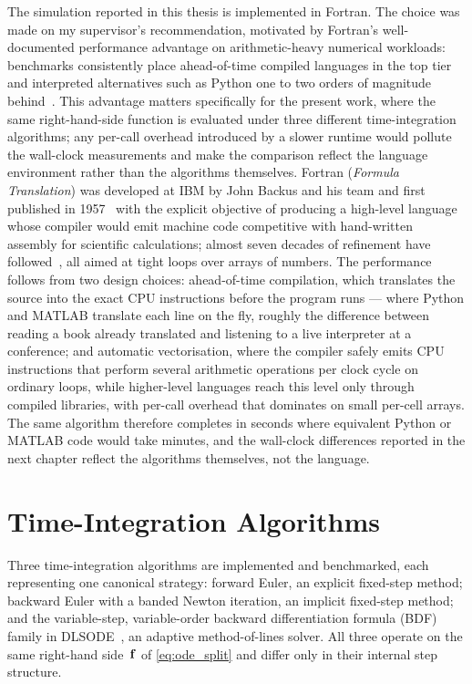 The simulation reported in this thesis is implemented in Fortran. The choice was made on my supervisor's recommendation, motivated by Fortran's well-documented performance advantage on arithmetic-heavy numerical workloads: benchmarks consistently place ahead-of-time compiled languages in the top tier and interpreted alternatives such as Python one to two orders of magnitude behind~\cite{Pereira2017}. This advantage matters specifically for the present work, where the same right-hand-side function is evaluated under three different time-integration algorithms; any per-call overhead introduced by a slower runtime would pollute the wall-clock measurements and make the comparison reflect the language environment rather than the algorithms themselves. Fortran (\emph{Formula Translation}) was developed at IBM by John Backus and his team and first published in 1957~\cite{Backus1957} with the explicit objective of producing a high-level language whose compiler would emit machine code competitive with hand-written assembly for scientific calculations; almost seven decades of refinement have followed~\cite{MetcalfReidCohen2018}, all aimed at tight loops over arrays of numbers. The performance follows from two design choices: ahead-of-time compilation, which translates the source into the exact CPU instructions before the program runs --- where Python and MATLAB translate each line on the fly, roughly the difference between reading a book already translated and listening to a live interpreter at a conference; and automatic vectorisation, where the compiler safely emits CPU instructions that perform several arithmetic operations per clock cycle on ordinary loops, while higher-level languages reach this level only through compiled libraries, with per-call overhead that dominates on small per-cell arrays. The same algorithm therefore completes in seconds where equivalent Python or MATLAB code would take minutes, and the wall-clock differences reported in the next chapter reflect the algorithms themselves, not the language.

\section{Time-Integration Algorithms}\label{sec:solvers}

Three time-integration algorithms are implemented and benchmarked, each representing one canonical strategy: forward Euler, an explicit fixed-step method; backward Euler with a banded Newton iteration, an implicit fixed-step method; and the variable-step, variable-order backward differentiation formula (BDF) family in DLSODE~\cite{Hindmarsh1983}, an adaptive method-of-lines solver. All three operate on the same right-hand side~\(\mathbf{f}\) of \cref{eq:ode_split} and differ only in their internal step structure.

